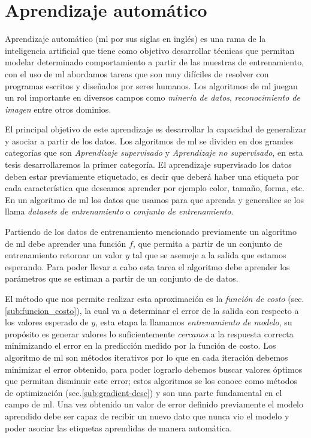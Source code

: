 \section{Aprendizaje automático}\label{sec:machinelaerning}

Aprendizaje automático (\ac{ml} por sus siglas en inglés) es una rama de la inteligencia artificial que tiene como objetivo desarrollar técnicas que permitan modelar determinado comportamiento a partir de las muestras de entrenamiento, con el uso de \ac{ml} abordamos tareas que son muy difíciles de resolver con programas escritos y diseñados por seres humanos. Los algoritmos de \ac{ml} juegan un rol importante en diversos campos como \textit{minería de datos}, \textit{reconocimiento de imagen} entre otros dominios.

El principal objetivo de este aprendizaje es desarrollar la capacidad de generalizar y asociar a partir de los datos. Los algoritmos de  \ac{ml} se dividen en dos grandes categorías que son \textit{Aprendizaje supervisado} y \textit{Aprendizaje no supervisado},  en esta tesis desarrollaremos la primer categoría.  El aprendizaje supervisado los datos deben estar previamente etiquetado, es decir que deberá haber una etiqueta por cada característica que deseamos aprender por ejemplo color, tamaño, forma, etc. En un algoritmo de \ac{ml} los datos que usamos para que aprenda y generalice se los llama \textit{datasets de entrenamiento} o \textit{conjunto de entrenamiento}.

Partiendo de los datos de entrenamiento mencionado previamente un algoritmo de \ac{ml} debe aprender una función  $ f$, que permita a partir de un conjunto de entrenamiento retornar un valor $y$ tal que se asemeje a la salida que estamos esperando. Para poder llevar a cabo esta tarea el algoritmo debe aprender los parámetros que se estiman a partir de un conjunto de de datos.

El método que nos permite realizar esta aproximación es la \textit{función de costo} (sec.\ref{sub:funcion_costo}), la cual va a  determinar el error de la salida con respecto a los valores esperado de  $y$, esta etapa la llamamos \textit{entrenamiento de modelo}, su propósito es generar valores lo suficientemente \textit{cercanos} a la respuesta correcta minimizando el error en la predicción medido por la función de costo. Los algoritmo de \ac{ml} son métodos iterativos por lo que en cada iteración debemos minimizar el error obtenido, para poder lograrlo debemos buscar valores óptimos que permitan disminuir este error;  estos algoritmos se los conoce como métodos de optimización (sec.\ref{sub:gradient-desc}) y son una parte fundamental en el campo de \ac{ml}. Una vez obtenido un valor de error definido previamente el modelo aprendido debe ser capaz de recibir un nuevo dato que nunca vio el modelo y poder asociar las etiquetas aprendidas de manera automática. 

